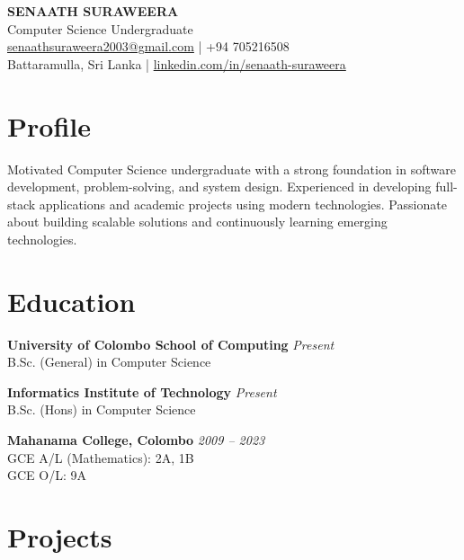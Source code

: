 \documentclass[a4paper,10pt]{article}
\begin{document}
\begin{center}
    {\Huge \textbf{SENAATH SURAWEERA}}\\
    \vspace{4pt}
    \small Computer Science Undergraduate \\
    \vspace{6pt}
    \href{mailto:senaathsuraweera2003@gmail.com}{senaathsuraweera2003@gmail.com} \quad | \quad +94 705216508 \\
    Battaramulla, Sri Lanka \quad | \quad 
    \href{https://www.linkedin.com/in/senaath-suraweera}{linkedin.com/in/senaath-suraweera}
\end{center}

\vspace{8pt}

\section*{Profile}
Motivated Computer Science undergraduate with a strong foundation in software development, problem-solving, and system design. Experienced in developing full-stack applications and academic projects using modern technologies. Passionate about building scalable solutions and continuously learning emerging technologies.

\section*{Education}

\textbf{University of Colombo School of Computing} \hfill \textit{Present}\\
B.Sc. (General) in Computer Science

\textbf{Informatics Institute of Technology} \hfill \textit{Present}\\
B.Sc. (Hons) in Computer Science

\textbf{Mahanama College, Colombo} \hfill \textit{2009 -- 2023}\\
GCE A/L (Mathematics): 2A, 1B \\
GCE O/L: 9A

\section*{Projects}
\end{document}
